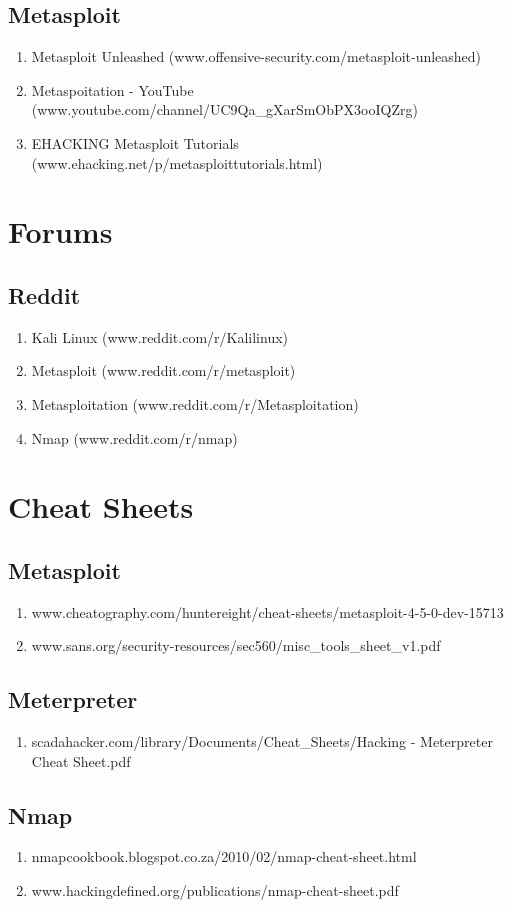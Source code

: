 \documentclass[a4paper]{article}
\begin{document}
\subsection{Metasploit}
\begin{enumerate}
	\item Metasploit Unleashed (www.offensive-security.com/metasploit-unleashed)
    \item Metaspoitation - YouTube (www.youtube.com/channel/UC9Qa\_gXarSmObPX3ooIQZrg)
	\item EHACKING Metasploit Tutorials (www.ehacking.net/p/metasploittutorials.html)
\end{enumerate}
	
\section{Forums}

\subsection{Reddit}

\begin{enumerate}
	\item Kali Linux (www.reddit.com/r/Kalilinux)
	\item Metasploit (www.reddit.com/r/metasploit)
	\item Metasploitation (www.reddit.com/r/Metasploitation) 
    \item Nmap (www.reddit.com/r/nmap)
\end{enumerate}

\section{Cheat Sheets}

\subsection{Metasploit}
\begin{enumerate}
	\item www.cheatography.com/huntereight/cheat-sheets/metasploit-4-5-0-dev-15713
	\item www.sans.org/security-resources/sec560/misc\_tools\_sheet\_v1.pdf
\end{enumerate}

\subsection{Meterpreter}
\begin{enumerate}
	\item scadahacker.com/library/Documents/Cheat\_Sheets/Hacking - Meterpreter Cheat  Sheet.pdf
\end{enumerate}

\subsection{Nmap}
\begin{enumerate}
	\item nmapcookbook.blogspot.co.za/2010/02/nmap-cheat-sheet.html
	\item www.hackingdefined.org/publications/nmap-cheat-sheet.pdf
\end{enumerate}
\end{document}
